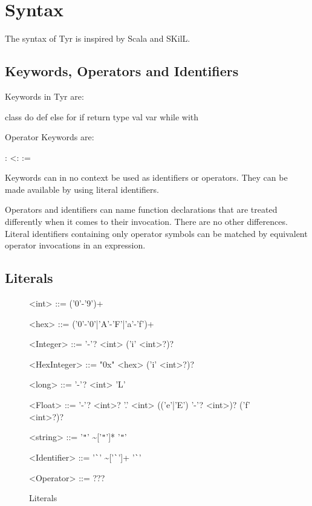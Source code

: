 \section{Syntax}

The syntax of Tyr is inspired by Scala and SKilL.

\subsection{Keywords, Operators and Identifiers}

Keywords in Tyr are:
\begin{center}
class
	\quad do
    \quad def
	\quad else
	\quad for
	\quad if
	\quad return
	\quad type
    \quad val
	\quad var
	\quad while
	\quad with
\end{center}
Operator Keywords are:
\begin{center}
 :
\quad <:
\quad :=	
\end{center}

Keywords can in no context be used as identifiers or operators.
They can be made available by using literal identifiers.

Operators and identifiers can name function declarations that are treated differently when it comes to their invocation.
There are no other differences.
Literal identifiers containing only operator symbols can be matched by equivalent operator invocations in an expression.

\subsection{Literals}


\begin{figure}
	\begin{grammar}
		<int> ::= ('0'-'9')+
		
		<hex> ::= ('0'-'0'|'A'-'F'|'a'-'f')+
		
		<Integer> ::= '-'? <int> ('i' <int>?)?
		
		<HexInteger> ::= "0x" <hex> ('i' <int>?)?
		
		<long> ::= '-'? <int> 'L'
		
		<Float> ::= '-'? <int>? '.' <int> (('e'|'E') '-'? <int>)? ('f' <int>?)?
		
		<string> ::= '\verb|"|' \textasciitilde['\verb|"|']* '\verb|"|'
		
		<Identifier> ::= '\verb|`|' \textasciitilde['\verb|`|']+ '\verb|`|'
		
		<Operator> ::= ???
	\end{grammar}
	\caption{Literals}
	\label{fig:syn:literals}
\end{figure}

